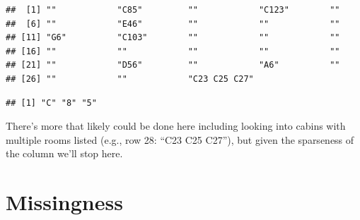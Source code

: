 \documentclass[]{book}
\newenvironment{Shaded}{\begin{snugshade}}{\end{snugshade}}
\newcommand{\KeywordTok}[1]{\textcolor[rgb]{0.13,0.29,0.53}{\textbf{#1}}}
\newcommand{\DecValTok}[1]{\textcolor[rgb]{0.00,0.00,0.81}{#1}}
\newcommand{\CommentTok}[1]{\textcolor[rgb]{0.56,0.35,0.01}{\textit{#1}}}
\newcommand{\OtherTok}[1]{\textcolor[rgb]{0.56,0.35,0.01}{#1}}
\newcommand{\ControlFlowTok}[1]{\textcolor[rgb]{0.13,0.29,0.53}{\textbf{#1}}}
\newcommand{\OperatorTok}[1]{\textcolor[rgb]{0.81,0.36,0.00}{\textbf{#1}}}
\newcommand{\NormalTok}[1]{#1}
\theoremstyle{definition}
\theoremstyle{definition}
\theoremstyle{definition}
\theoremstyle{remark}
\begin{document}
\begin{Shaded}
\end{Shaded}

\begin{verbatim}
##  [1] ""            "C85"         ""            "C123"        ""           
##  [6] ""            "E46"         ""            ""            ""           
## [11] "G6"          "C103"        ""            ""            ""           
## [16] ""            ""            ""            ""            ""           
## [21] ""            "D56"         ""            "A6"          ""           
## [26] ""            ""            "C23 C25 C27"
\end{verbatim}

\begin{Shaded}
\end{Shaded}

\begin{verbatim}
## [1] "C" "8" "5"
\end{verbatim}

\begin{Shaded}
\end{Shaded}

There's more that likely could be done here including looking into
cabins with multiple rooms listed (e.g., row 28: ``C23 C25 C27''), but
given the sparseness of the column we'll stop here.

\section{Missingness}\label{missingness}
\end{document}
